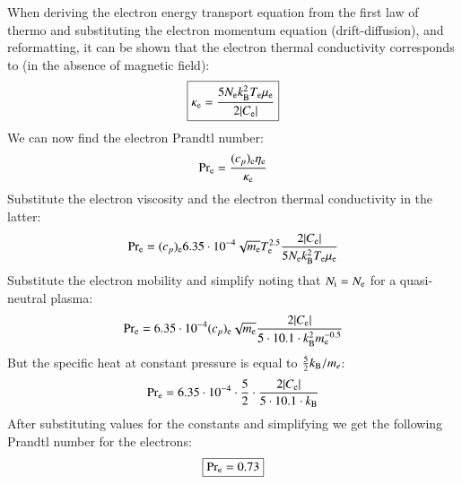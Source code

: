 \documentclass{warpdoc}
\newcommand\frameeqn[1]{\fbox{$\displaystyle #1$}}
\begin{document}
When deriving the electron energy transport equation from the first law of thermo and substituting the electron momentum equation (drift-diffusion), and reformatting, it can be shown that the electron thermal conductivity corresponds to (in the absence of magnetic field):
%
\begin{equation}
\frameeqn{
 \kappa_{\rm e}=\frac{5 N_{\rm e} k_{\rm B}^2 T_{\rm e} \mu_{\rm e}}{2|C_{\rm e}|}
}
\end{equation}
%
We can now find the electron Prandtl number:
%
\begin{equation}
 {\rm Pr_e} = \frac{(c_p)_{\rm e} \eta_{\rm e}}{\kappa_{\rm e}}
\end{equation}
%
Substitute the electron viscosity and the electron thermal conductivity in the latter:
%
\begin{equation}
 {\rm Pr_e} = (c_p)_{\rm e}  6.35 \cdot 10^{-4}  \sqrt{m_{\rm e}}   T_{\rm e}^{2.5} \frac{2|C_{\rm e}|}{5 N_{\rm e} k_{\rm B}^2 T_{\rm e} \mu_{\rm e}}
\end{equation}
%
Substitute the electron mobility and simplify noting that $N_{\rm i} = N_{\rm e}$ for a quasi-neutral plasma:
%
\begin{equation}
 {\rm Pr_e} = 6.35 \cdot 10^{-4} (c_p)_{\rm e}    \sqrt{m_{\rm e}}    \frac{2|C_{\rm e}|}{5\cdot 10.1\cdot  k_{\rm B}^2   m_{\rm e}^{-0.5}  }
\end{equation}
%
But the specific heat at constant pressure is equal to $\frac{5}{2}k_{\rm B}/m_e$:
%
\begin{equation}
 {\rm Pr_e} = 6.35 \cdot 10^{-4} \cdot \frac{5}{2}  \cdot      \frac{2|C_{\rm e}|}{5\cdot 10.1\cdot  k_{\rm B}    }
\end{equation}
%
After substituting values for the constants and simplifying we get the following Prandtl number for the electrons:
%
\begin{equation}
\frameeqn{
 {\rm Pr_e} = 0.73
}
\end{equation}
%








\appendix


  
  
\end{document}
